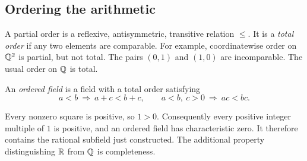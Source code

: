 \subsection{Ordering the arithmetic}
A partial order is a reflexive, antisymmetric, transitive relation $\leq$.
It is a \emph{total order} if any two elements are comparable.
For example, coordinatewise order on $\mathbb{Q}^2$ is partial,
but not total. The pairs $(0,1)$ and $(1,0)$ are incomparable. The usual order on $\mathbb{Q}$ is total.

\begin{definition}
  An \emph{ordered field} is a field with a total order satisfying
  \[
    a<b\ \Longrightarrow\ a+c<b+c,
    \qquad
    a<b,\ c>0\ \Longrightarrow\ ac<bc.
  \]
\end{definition}
Every nonzero square is positive, so $1>0$. Consequently every positive
integer multiple of $1$ is positive, and an ordered field has characteristic
zero. It therefore contains the rational subfield just constructed.
The additional property distinguishing $\mathbb{R}$ from $\mathbb{Q}$ is completeness.
